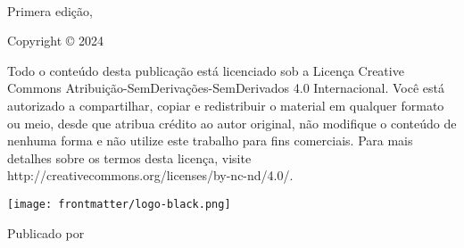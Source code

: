 
{\small
\setlength{\parindent}{0em}\setlength{\parskip}{1em}
~
\vfill

Primera edição, \editionyear{}

Copyright \copyright{} 2024 \authorname

Todo o conteúdo desta publicação está licenciado sob a Licença Creative Commons Atribuição-SemDerivações-SemDerivados 4.0 Internacional. Você está autorizado a compartilhar, copiar e redistribuir o material em qualquer formato ou meio, desde que atribua crédito ao autor original, não modifique o conteúdo de nenhuma forma e não utilize este trabalho para fins comerciais. Para mais detalhes sobre os termos desta licença, visite http://creativecommons.org/licenses/by-nc-nd/4.0/.

\ifx\isbn\undefined\else\if\relax\detokenize\expandafter{\isbn}\relax{}\fi\fi

\texttt{[image: frontmatter/logo-black.png]}

Publicado por \publisher{}
}
